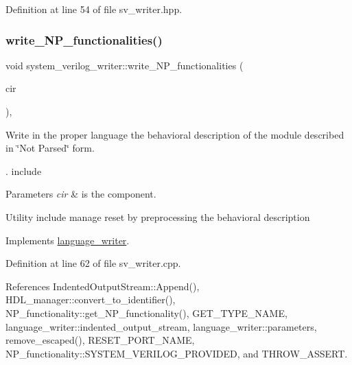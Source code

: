 Definition at line 54 of file sv\+\_\+writer.\+hpp.

\mbox{\label{classsystem__verilog__writer_ad9f3428bb7369c26e54a1b7ff7119d9c}} 
\subsubsection{\texorpdfstring{write\+\_\+\+N\+P\+\_\+functionalities()}{write\_NP\_functionalities()}}
{\footnotesize\ttfamily void system\+\_\+verilog\+\_\+writer\+::write\+\_\+\+N\+P\+\_\+functionalities (\begin{DoxyParamCaption}\item[{const \hyperlink{structural__objects_8hpp_a8ea5f8cc50ab8f4c31e2751074ff60b2}{structural\+\_\+object\+Ref} \&}]{cir }\end{DoxyParamCaption})\hspace{0.3cm}{\ttfamily [override]}, {\ttfamily [virtual]}}



Write in the proper language the behavioral description of the module described in \char`\"{}\+Not Parsed\char`\"{} form. 

. include


\begin{DoxyParams}{Parameters}
{\em cir} & is the component.\\
\hline
\end{DoxyParams}
Utility include manage reset by preprocessing the behavioral description 

Implements \hyperlink{classlanguage__writer_a75a800dc2e7afbecf76f1acaae82b6ce}{language\+\_\+writer}.



Definition at line 62 of file sv\+\_\+writer.\+cpp.



References Indented\+Output\+Stream\+::\+Append(), H\+D\+L\+\_\+manager\+::convert\+\_\+to\+\_\+identifier(), N\+P\+\_\+functionality\+::get\+\_\+\+N\+P\+\_\+functionality(), G\+E\+T\+\_\+\+T\+Y\+P\+E\+\_\+\+N\+A\+ME, language\+\_\+writer\+::indented\+\_\+output\+\_\+stream, language\+\_\+writer\+::parameters, remove\+\_\+escaped(), R\+E\+S\+E\+T\+\_\+\+P\+O\+R\+T\+\_\+\+N\+A\+ME, N\+P\+\_\+functionality\+::\+S\+Y\+S\+T\+E\+M\+\_\+\+V\+E\+R\+I\+L\+O\+G\+\_\+\+P\+R\+O\+V\+I\+D\+ED, and T\+H\+R\+O\+W\+\_\+\+A\+S\+S\+E\+RT.



